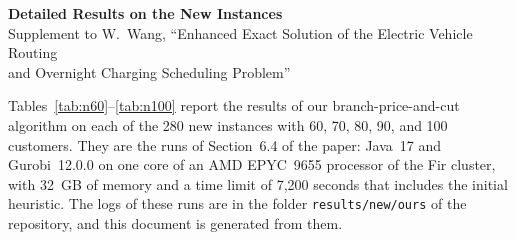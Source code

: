 \documentclass[10pt]{article}
\begin{document}
\begin{center}
{\Large\bfseries Detailed Results on the New Instances}\\[0.8em]
Supplement to W.~Wang, ``Enhanced Exact Solution of the Electric Vehicle Routing\\
and Overnight Charging Scheduling Problem''
\end{center}

\vspace{1em}
Tables~\ref{tab:n60}--\ref{tab:n100} report the results of our branch-price-and-cut algorithm on each of the 280 new instances with 60, 70, 80, 90, and 100 customers. They are the runs of Section~6.4 of the paper: Java~17 and Gurobi~12.0.0 on one core of an AMD EPYC~9655 processor of the Fir cluster, with 32~GB of memory and a time limit of 7{,}200 seconds that includes the initial heuristic. The logs of these runs are in the folder \texttt{results/new/ours} of the repository, and this document is generated from them.
\end{document}
